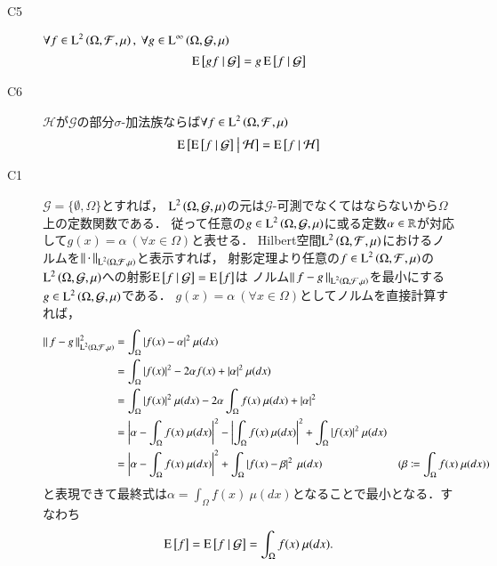 \begin{qst}
\begin{description}
			\item[C5]	$\forall f \in \operatorname{L}^{2} \left(\Omega, \mathcal{F},\mu\right),\ \forall g \in \operatorname{L}^{\infty} \left(\Omega, \mathcal{G},\mu\right)$
				\begin{align}
					\operatorname{E} \left[ gf \ \middle|\ \mathcal{G} \right] = g\operatorname{E} \left[ f \ \middle|\ \mathcal{G} \right]
				\end{align}
			
			\item[C6]	$\mathcal{H}$が$\mathcal{G}$の部分$\sigma$-加法族ならば$\forall f \in \operatorname{L}^{2} \left(\Omega, \mathcal{F},\mu\right)$
				\begin{align}
					\operatorname{E} \left[ \operatorname{E} \left[ f \ \middle|\ \mathcal{G} \right] \ \middle|\ \mathcal{H} \right] = \operatorname{E} \left[ f \ \middle|\ \mathcal{H} \right]
				\end{align}
		\end{description}
	\end{qst}
	
	\begin{prf}
		\begin{description}
			\item[C1] $\mathcal{G} = \{\emptyset, \Omega\}$とすれば，
				$\operatorname{L}^{2} \left(\Omega, \mathcal{G},\mu\right)$の元は$\mathcal{G}$-可測でなくてはならないから$\Omega$上の定数関数である．
				従って任意の$g \in \operatorname{L}^{2} \left(\Omega, \mathcal{G},\mu\right)$に或る定数$\alpha \in \mathbb{R}$が対応して$g(x)=\alpha\ (\forall x \in \Omega)$と表せる．
				Hilbert空間$\operatorname{L}^{2} \left(\Omega, \mathcal{F},\mu\right)$におけるノルムを$\left\|\, \cdot\, \right\|_{\operatorname{L}^{2} \left(\Omega, \mathcal{F},\mu\right)}$と表示すれば，
				射影定理より任意の$f \in \operatorname{L}^{2} \left(\Omega, \mathcal{F},\mu\right)$の$\operatorname{L}^{2} \left(\Omega, \mathcal{G},\mu\right)$への射影$\operatorname{E} \left[ f \ \middle|\ \mathcal{G} \right] = \operatorname{E} \left[ f \right]$は
				ノルム$\left\|\, f-g\, \right\|_{\operatorname{L}^{2} \left(\Omega, \mathcal{F},\mu\right)}$を最小にする$g \in \operatorname{L}^{2} \left(\Omega, \mathcal{G},\mu\right)$である．
				$g(x)=\alpha\ (\forall x \in \Omega)$としてノルムを直接計算すれば，
				\begin{align}
					\left\|\, f-g\, \right\|_{\operatorname{L}^{2} \left(\Omega, \mathcal{F},\mu\right)}^2 &= \int_{\Omega} |f(x) - \alpha|^2\ \mu(dx) \\
					&= \int_{\Omega} |f(x)|^2 - 2 \alpha f(x) + |\alpha|^2\ \mu(dx) \\
					&= \int_{\Omega} |f(x)|^2\ \mu(dx) - 2 \alpha \int_{\Omega} f(x)\ \mu(dx) + |\alpha|^2 \\
					&= \left| \alpha - \int_{\Omega} f(x)\ \mu(dx) \right|^2 - \left| \int_{\Omega} f(x)\ \mu(dx) \right|^2 + \int_{\Omega} |f(x)|^2\ \mu(dx) \\
					&= \left| \alpha - \int_{\Omega} f(x)\ \mu(dx) \right|^2 + \int_{\Omega} \left| f(x) - \beta \right|^2\ \mu(dx) & (\beta \coloneqq \int_{\Omega} f(x)\ \mu(dx))
				\end{align}
				と表現できて最終式は$\alpha = \int_{\Omega} f(x)\ \mu(dx)$となることで最小となる．すなわち
				\begin{align}
					\operatorname{E} \left[ f \right] = \operatorname{E} \left[ f \ \middle|\ \mathcal{G} \right] = \int_{\Omega} f(x)\ \mu(dx).
				\end{align}
			

\end{description}
\end{prf}
